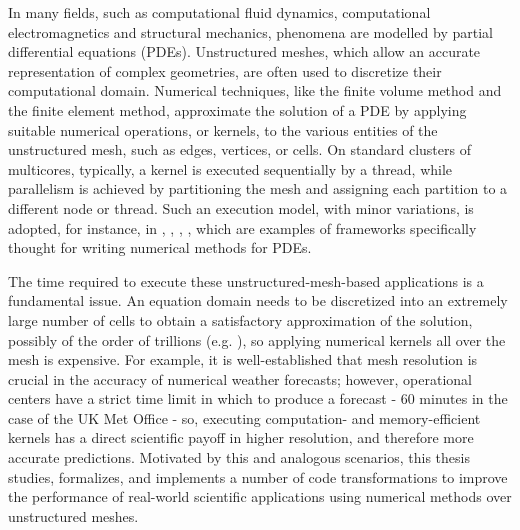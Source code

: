 In many fields, such as computational fluid dynamics, computational
electromagnetics and structural mechanics, phenomena are modelled by
partial differential equations (PDEs). Unstructured meshes, which
allow an accurate representation of complex geometries, are often used 
to discretize their computational domain. Numerical techniques, like the
finite volume method and the finite element method, approximate the solution 
of a PDE by applying suitable numerical operations, or kernels, to the 
various entities of the unstructured mesh, such as edges, vertices, or
cells. On standard clusters of multicores, typically, a kernel is
executed sequentially by a thread, while parallelism is achieved by
partitioning the mesh and assigning each partition to a different node
or thread. Such an execution model, with minor variations, is adopted,
for instance, in \cite{pyop2isc}, \cite{Fenics}, \cite{fluidity_manual_v4}, \cite{lizst}, which
are examples of frameworks specifically thought for writing numerical methods for PDEs.

The time required to execute these unstructured-mesh-based applications is a fundamental issue.
An equation domain needs to be discretized into an extremely
large number of cells to obtain a satisfactory approximation
of the solution, possibly of the order of trillions
(e.g. \cite{Rossinelli2013}), so applying numerical kernels all over the mesh is expensive. 
For example, it is well-established that mesh resolution is crucial in the accuracy of numerical weather
forecasts; however, operational centers have a strict time
limit in which to produce a forecast - 60 minutes in the case of the
UK Met Office - so, executing computation- and memory-efficient 
kernels has a direct scientific payoff in higher resolution, and 
therefore more accurate predictions. Motivated by this and analogous scenarios, 
this thesis studies, formalizes, and implements a number of
code transformations to improve the performance of real-world scientific 
applications using numerical methods over unstructured meshes. 

